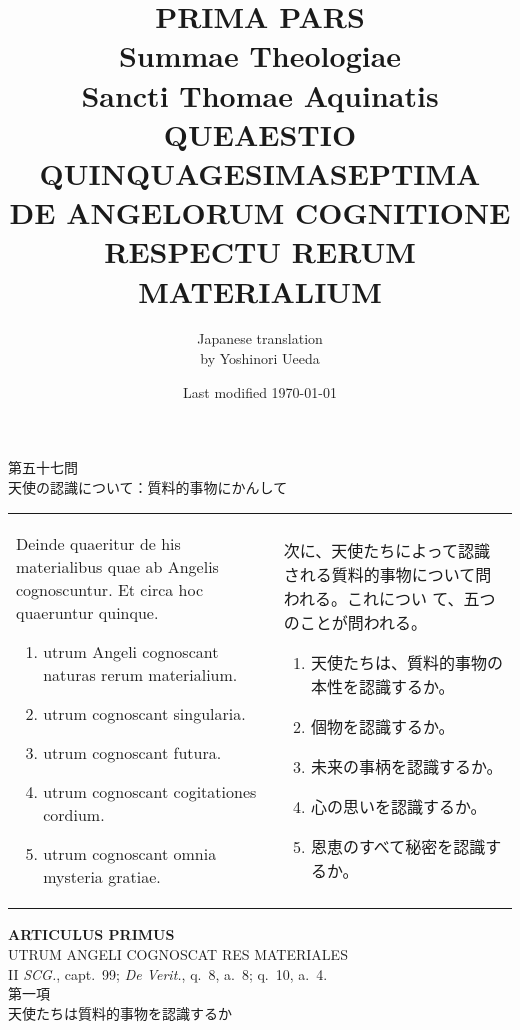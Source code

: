 \documentclass[10pt]{jsarticle} %
\title{{\bf PRIMA PARS}\\{\HUGE Summae Theologiae}\\Sancti Thomae
Aquinatis\\{\sffamily QUEAESTIO QUINQUAGESIMASEPTIMA}\\DE ANGELORUM COGNITIONE
 RESPECTU RERUM MATERIALIUM}
\author{Japanese translation\\by Yoshinori {\sc Ueeda}}
\date{Last modified \today}
\begin{document}
\maketitle
\pagestyle{fancy}

\begin{center}
{\Large 第五十七問\\天使の認識について：質料的事物にかんして}
\end{center}

\begin{longtable}{p{21em}p{21em}}

Deinde quaeritur de his materialibus quae ab Angelis cognoscuntur. Et
 circa hoc quaeruntur quinque.

\begin{enumerate}
 \item utrum Angeli cognoscant naturas rerum materialium.
 \item utrum cognoscant singularia.
 \item utrum cognoscant futura.
 \item utrum cognoscant cogitationes cordium.
 \item utrum cognoscant omnia mysteria gratiae.
\end{enumerate}


 &

 次に、天使たちによって認識される質料的事物について問われる。これについ
 て、五つのことが問われる。
 \begin{enumerate}
  \item 天使たちは、質料的事物の本性を認識するか。
  \item 個物を認識するか。
  \item 未来の事柄を認識するか。
  \item 心の思いを認識するか。
  \item 恩恵のすべて秘密を認識するか。
 \end{enumerate}

\end{longtable}
\newpage

\begin{center}
 {\Large {\bf ARTICULUS PRIMUS}}\\
 {\large UTRUM ANGELI COGNOSCAT RES MATERIALES}\\
 {\footnotesize II {\itshape SCG.}, capt.~99; {\itshape De Verit.},
 q.~8, a.~8; q.~10, a.~4.}\\
 {\Large 第一項\\天使たちは質料的事物を認識するか}
\end{center}
\end{document}
